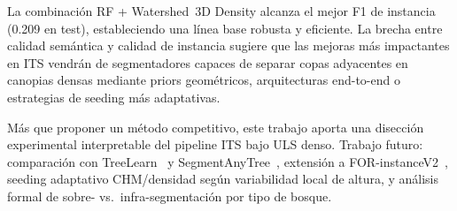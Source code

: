 \documentclass[runningheads]{llncs}
\begin{document}
La combinación RF + Watershed~3D Density alcanza el mejor F1 de instancia (0.209 en test), estableciendo una línea base robusta y eficiente. La brecha entre calidad semántica y calidad de instancia sugiere que las mejoras más impactantes en ITS vendrán de segmentadores capaces de separar copas adyacentes en canopias densas mediante priors geométricos, arquitecturas end-to-end o estrategias de seeding más adaptativas.

Más que proponer un método competitivo, este trabajo aporta una disección experimental interpretable del pipeline ITS bajo ULS denso. Trabajo futuro: comparación con TreeLearn~\cite{henrich2024} y SegmentAnyTree~\cite{wielgosz2024}, extensión a FOR-instanceV2~\cite{xiang2025}, seeding adaptativo CHM/densidad según variabilidad local de altura, y análisis formal de sobre- vs.\ infra-segmentación por tipo de bosque.
\end{document}
